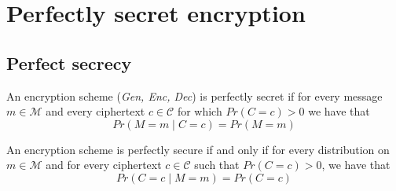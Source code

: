 \documentclass[../main]{subfiles}
\begin{document}
\chapter{Perfectly secret encryption}

\section{Perfect secrecy}

\begin{definition}
    An encryption scheme (\textit{Gen, Enc, Dec}) is perfectly secret if for every message $m \in{} \mathcal{M}$ and every ciphertext $c \in{} \mathcal{C}$ for which $Pr(C=c)>0$ we have that $$Pr(M=m \mid{} C=c) = Pr(M=m)$$
\end{definition}

\begin{lemma}
    \label{lemma:perfect-secrecy-first-characterization}
    An encryption scheme is perfectly secure if and only if for every distribution on $m \in{} \mathcal{M}$ and for every ciphertext $c \in{} \mathcal{C}$ such that $Pr(C=c) > 0$, we have that $$Pr(C=c \mid{} M=m) = Pr(C=c)$$
\end{lemma}
\end{document}
